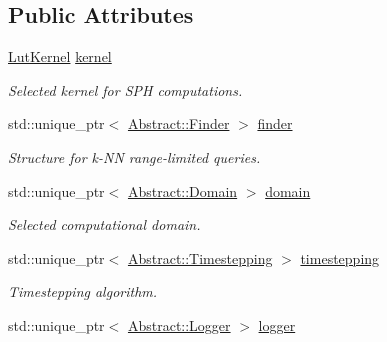\subsection*{Public Attributes}
\begin{DoxyCompactItemize}
\item 
\hypertarget{classProblem_aff927e5e10d30c96710807d1462476b4}{}\label{classProblem_aff927e5e10d30c96710807d1462476b4} 
\hyperlink{classLutKernel}{Lut\+Kernel} \hyperlink{classProblem_aff927e5e10d30c96710807d1462476b4}{kernel}
\begin{DoxyCompactList}\small\item\em Selected kernel for S\+PH computations. \end{DoxyCompactList}\item 
\hypertarget{classProblem_a6895f42599f432d175a96fbc48e5dcbf}{}\label{classProblem_a6895f42599f432d175a96fbc48e5dcbf} 
std\+::unique\+\_\+ptr$<$ \hyperlink{classAbstract_1_1Finder}{Abstract\+::\+Finder} $>$ \hyperlink{classProblem_a6895f42599f432d175a96fbc48e5dcbf}{finder}
\begin{DoxyCompactList}\small\item\em Structure for k-\/\+NN range-\/limited queries. \end{DoxyCompactList}\item 
\hypertarget{classProblem_a14657abcb68541eaee89483d8086d66d}{}\label{classProblem_a14657abcb68541eaee89483d8086d66d} 
std\+::unique\+\_\+ptr$<$ \hyperlink{classAbstract_1_1Domain}{Abstract\+::\+Domain} $>$ \hyperlink{classProblem_a14657abcb68541eaee89483d8086d66d}{domain}
\begin{DoxyCompactList}\small\item\em Selected computational domain. \end{DoxyCompactList}\item 
\hypertarget{classProblem_ac7ea807f825bf095e17ca55c4236a716}{}\label{classProblem_ac7ea807f825bf095e17ca55c4236a716} 
std\+::unique\+\_\+ptr$<$ \hyperlink{classAbstract_1_1Timestepping}{Abstract\+::\+Timestepping} $>$ \hyperlink{classProblem_ac7ea807f825bf095e17ca55c4236a716}{timestepping}
\begin{DoxyCompactList}\small\item\em Timestepping algorithm. \end{DoxyCompactList}\item 
\hypertarget{classProblem_a61d1fdc0e919a281b8b547fb2765daee}{}\label{classProblem_a61d1fdc0e919a281b8b547fb2765daee} 
std\+::unique\+\_\+ptr$<$ \hyperlink{classAbstract_1_1Logger}{Abstract\+::\+Logger} $>$ \hyperlink{classProblem_a61d1fdc0e919a281b8b547fb2765daee}{logger}

\end{DoxyCompactItemize}
